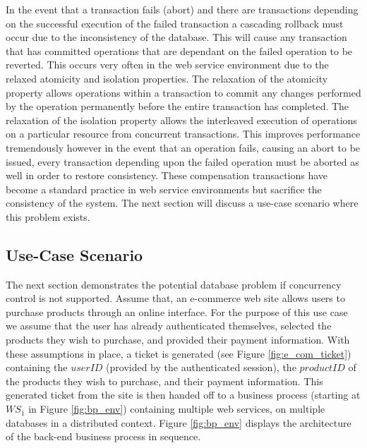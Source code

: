 \documentclass[conference]{IEEEtran}
\begin{document}
In the event that a transaction fails (abort) and there are transactions depending on the successful execution of the failed transaction a cascading rollback must occur due to the inconsistency of the database. This will cause any transaction that has committed operations that are dependant on the failed operation to be reverted. This occurs very often in the web service environment due to the relaxed atomicity and isolation properties. The relaxation of the atomicity property allows operations within a transaction to commit any changes performed by the operation permanently before the entire transaction has completed. The relaxation of the isolation property allows the interleaved execution of operations on a particular resource from concurrent transactions. This improves performance tremendously however in the event that an operation fails, causing an abort to be issued, every transaction depending upon the failed operation must be aborted as well in order to restore consistency. These compensation transactions have become a standard practice in web service environments but sacrifice the consistency of the system. The next section will discuss a use-case scenario where this problem exists.

\subsection{Use-Case Scenario}
The next section demonstrates the potential database problem if concurrency control is not supported. Assume that, an e-commerce web site allows users to purchase products through an online interface. For the purpose of this use case we assume that the user has already authenticated themselves, selected the products they wish to purchase, and provided their payment information. With these assumptions in place, a ticket is generated (see Figure \ref{fig:e_com_ticket}) containing the $userID$ (provided by the authenticated session), the $productID$ of the products they wish to purchase, and their payment information. This generated ticket from the site is then handed off to a business process (starting at $WS_{1}$ in Figure \ref{fig:bp_env}) containing multiple web services, on multiple databases in a distributed context. Figure \ref{fig:bp_env} displays the architecture of the back-end business process in sequence.
\end{document}
